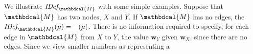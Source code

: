 \documentclass[letterpaper]{article} %
\theoremstyle{plain}
\theoremstyle{definition}
\theoremstyle{remark}
\newcommand{\commentout}[1]{\ignorespaces}
\let\H\relax
\DeclareMathOperator{\H}{\mathrm{H}} %
\newcommand\mat[1]{\mathbf{#1}}
\newcommand{\dg}[1]{\mathbdcal{#1}}
\newcommand{\IDef}[1]{\mathit{IDef}_{\!#1}}
\begin{document}
We illustrate $\IDef{\dg M}$ with some simple examples.  
%
\commentout{
    	
      This approach combines the benefits of choosing
    the maximum-entropy distribution consistent with
    constraints \cite{Jaynes57}, while also providing the ability to back off of this (e.g., by providing a universal graph structure), and simultaneously providing a way of articulating qualitative independences.
    There is no information required
}
Suppose that $\dg M$ has two nodes, $X$ and $Y$.  If $\dg M$ has no edges, the
$\IDef{\dg M}(\mu) = - \H(\mu)$. There is no information required to specify, for
each edge in ${\dg M}$ from $X$ to $Y$, the value ${\mat w}_Y$ given ${\mat
w}_X$, since there are no edges. Since we view smaller numbers as representing a
\end{document}
